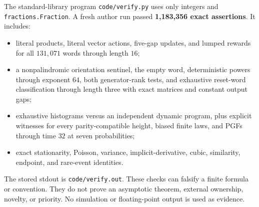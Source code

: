 The standard-library program \texttt{code/verify.py} uses only integers and
\texttt{fractions.Fraction}.  A fresh author run passed
\textbf{1,183,356 exact assertions}.  It includes:
\begin{itemize}
\item literal products, literal vector actions, five-gap updates, and lumped
      rewards for all $131{,}071$ words through length $16$;
\item a nonpalindromic orientation sentinel, the empty word, deterministic
      powers through exponent $64$, both generator-rank tests, and exhaustive
      reset-word classification through length three with exact matrices and
      constant output gaps;
\item exhaustive histograms versus an independent dynamic program, plus
      explicit witnesses for every parity-compatible height, biased finite
      laws, and PGFs through time $32$ at seven probabilities;
\item exact stationarity, Poisson, variance, implicit-derivative, cubic,
      similarity, endpoint, and rare-event identities.
\end{itemize}
The stored stdout is \texttt{code/verify.out}.  These checks can falsify a
finite formula or convention.  They do not prove an asymptotic theorem,
external ownership, novelty, or priority.  No simulation or floating-point
output is used as evidence.
